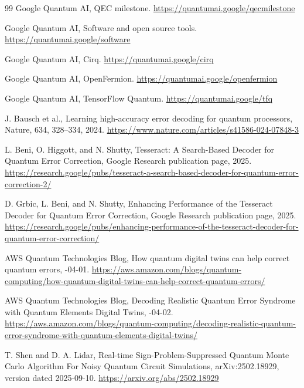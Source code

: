 \documentclass[11pt,a4paper]{article}
\begin{document}
\begin{thebibliography}{99}
Google Quantum AI,
\newblock QEC milestone.
\newblock \url{https://quantumai.google/qecmilestone}

Google Quantum AI,
\newblock Software and open source tools.
\newblock \url{https://quantumai.google/software}

Google Quantum AI,
\newblock Cirq.
\newblock \url{https://quantumai.google/cirq}

Google Quantum AI,
\newblock OpenFermion.
\newblock \url{https://quantumai.google/openfermion}

Google Quantum AI,
\newblock TensorFlow Quantum.
\newblock \url{https://quantumai.google/tfq}

J. Bausch et al.,
\newblock Learning high-accuracy error decoding for quantum processors,
\newblock Nature, 634, 328--334, 2024.
\newblock \url{https://www.nature.com/articles/s41586-024-07848-3}

L. Beni, O. Higgott, and N. Shutty,
\newblock Tesseract: A Search-Based Decoder for Quantum Error Correction,
\newblock Google Research publication page, 2025.
\newblock \url{https://research.google/pubs/tesseract-a-search-based-decoder-for-quantum-error-correction-2/}

D. Grbic, L. Beni, and N. Shutty,
\newblock Enhancing Performance of the Tesseract Decoder for Quantum Error Correction,
\newblock Google Research publication page, 2025.
\newblock \url{https://research.google/pubs/enhancing-performance-of-the-tesseract-decoder-for-quantum-error-correction/}

AWS Quantum Technologies Blog,
\newblock How quantum digital twins can help correct quantum errors,
-04-01.
\newblock \url{https://aws.amazon.com/blogs/quantum-computing/how-quantum-digital-twins-can-help-correct-quantum-errors/}

AWS Quantum Technologies Blog,
\newblock Decoding Realistic Quantum Error Syndrome with Quantum Elements Digital Twins,
-04-02.
\newblock \url{https://aws.amazon.com/blogs/quantum-computing/decoding-realistic-quantum-error-syndrome-with-quantum-elements-digital-twins/}

T. Shen and D. A. Lidar,
\newblock Real-time Sign-Problem-Suppressed Quantum Monte Carlo Algorithm For Noisy Quantum Circuit Simulations,
\newblock arXiv:2502.18929, version dated 2025-09-10.
\newblock \url{https://arxiv.org/abs/2502.18929}


\end{thebibliography}
\end{document}
